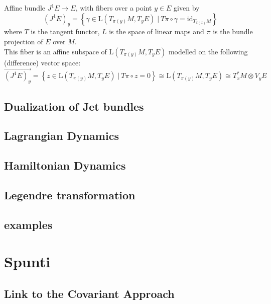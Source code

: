 \begin{definition}
Affine bundle $J^1 E \rightarrow E$, with fibers over a point $y\in E$ given by
\begin{displaymath}
	\left( J^1 E\right)_y = \left\lbrace \gamma \in \text{L}(T_{\pi(y)}M, T_y E) \; \vert \: T\pi \circ \gamma = \text{id}_{T_{\pi(x)} M} \right\rbrace
\end{displaymath}
where $T$ is the tangent functor, $L$ is the space of linear maps and $\pi$ is the bundle projection of $E$ over $M$.
\\
This fiber is an affine subspace of $\text{L}(T_{\pi(y)}M, T_y E)$ modelled on the following (difference) vector space:
\begin{displaymath}
	\vec{\left( J^1 E\right)_y} = \left\lbrace z \in \text{L}(T_{\pi(y)}M, T_y E) \; \vert \: T\pi \circ z = 0 \right\rbrace
	\cong \text{L}(T_{\pi(y)}M, T_y E)
	\cong T_x^\ast M \otimes V_y E
\end{displaymath}
\end{definition}



\subsection{Dualization of Jet bundles}

\subsection{Lagrangian Dynamics}

\subsection{Hamiltonian Dynamics}

\subsection{Legendre transformation}

\subsection{examples}

\section{Spunti}

\subsection{Link to the Covariant Approach}

